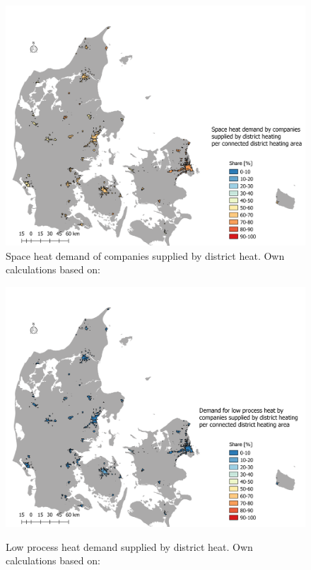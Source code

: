 \documentclass[review]{elsarticle}
\begin{document}
\begin{figure}[H]
\centering
\includegraphics[width=\linewidth]{Img/geo/DK_DH_Balmorel_areas2_DH_share_SH.png}
\caption{Space heat demand of companies supplied by district heat. Own calculations based on: \cite{kortforsyningen2017,virk2017,Buhler2017,Petrovic2014,VM2015,StatisticsDenmark2017}}
\label{fig:DH_SH_share}
\end{figure}

\begin{figure}[H]
\centering
\includegraphics[width=\linewidth]{Img/geo/DK_DH_Balmorel_areas2_DH_share_PHL.png}\\
\caption{Low process heat demand supplied by district heat. Own calculations based on: \cite{kortforsyningen2017,virk2017,Buhler2017,Petrovic2014,VM2015,StatisticsDenmark2017}}
\label{fig:DH_PHL_share}
\end{figure}
\end{document}
